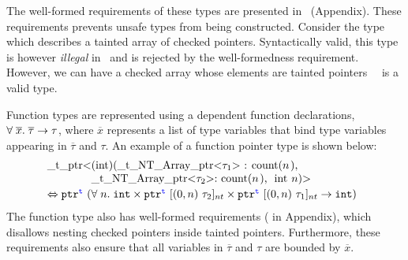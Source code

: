 The well-formed requirements of these types are presented in~ (Appendix).
% 
These requirements prevents unsafe types from being constructed.
  Consider the type ~ which describes a tainted
  array of checked pointers.
  Syntactically valid, this type is however \emph{illegal} in~\lang{} and
  is rejected by the well-formedness requirement. 
However, we can have a checked array whose elements are tainted pointers\mzs{,}\mzr{:}~\eg~ is a valid type.
% 

% 
Function types are represented using a dependent function declarations,~\ie $\forall \;\overline{x}.\;{\overline{\tau}}\to\tau$,
where $\overline{x}$ represents a list of \tint{} type variables that bind type variables appearing in $\overline{\tau}$ and $\tau$.
An example of a function pointer type is shown below:
\[\hspace*{-0.5em}
\begin{array}{l}
$\code{_t_ptr<(int)(_t_NT_Array_ptr<}$\tau_1$\code{> : count(}$n$\code{),}$\\
\qquad\qquad$\code{_t_NT_Array_ptr<}$\tau_2$\code{>: count(}$n$\code{), int}$\;n$\code{)>}$
\\[0.2em]
\Leftrightarrow\; $\tptr{(\tfun{n}{\tint \times \tntarrayptr{0}{n}{\tau_2}{\tmode} \times \tntarrayptr{0}{n}{\tau_1}{\tmode}}{\tint})}{\tmode}$
\end{array}
\]
The function type also has well-formed requirements ( in Appendix), which disallows nesting checked pointers inside tainted pointers.
Furthermore, these requirements also ensure that all variables in $\overline{\tau}$ and $\tau$ are bounded by $\overline{x}$.

